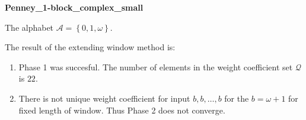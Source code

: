 \begin{exmp}
\textbf{ Penney\_1-block\_complex\_small }

\label{ex:Penney1-blockcomplexsmall}

The alphabet $\mathcal{A} =\left\{0, 1, \omega\right\}$.

The result of the extending window method is:
\begin{enumerate}
    \item Phase 1 was succesful.
The number of elements in the weight coefficient set $\mathcal{Q}$ is $22$.

    \item There is not unique weight coefficient for input $b,b,\dots,b$ for the $b= \omega + 1 $ for fixed length of window. Thus Phase 2 does not converge.

\end{enumerate}
\end{exmp}
